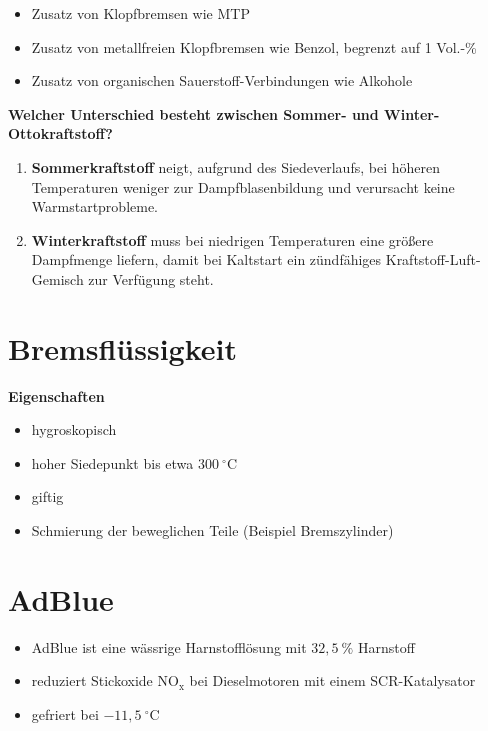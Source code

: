 \begin{enumerate}
  \begin{itemize}
  \item
    Zusatz von Klopfbremsen wie MTP
  \item
    Zusatz von metallfreien Klopfbremsen wie Benzol, begrenzt auf 1
    Vol.-\%
  \item
    Zusatz von organischen Sauerstoff-Verbindungen wie Alkohole
  \end{itemize}
\end{enumerate}

\textbf{Welcher Unterschied besteht zwischen Sommer- und
Winter-Ottokraftstoff?}

\begin{enumerate}
\item
  \textbf{Sommerkraftstoff} neigt, aufgrund des Siedeverlaufs, bei
  höheren Temperaturen weniger zur Dampfblasenbildung und verursacht
  keine Warmstartprobleme.
\item
  \textbf{Winterkraftstoff} muss bei niedrigen Temperaturen eine größere
  Dampfmenge liefern, damit bei Kaltstart ein zündfähiges
  Kraftstoff-Luft-Gemisch zur Verfügung steht.
\end{enumerate}

\section{Bremsflüssigkeit}\label{bremsfluessigkeit}

\textbf{Eigenschaften}

\begin{itemize}
\item
  hygroskopisch
\item
  hoher Siedepunkt bis etwa $300~^\circ\text{C}$
\item
  giftig
\item
  Schmierung der beweglichen Teile (Beispiel Bremszylinder)
\end{itemize}

\section{AdBlue}\label{adblue}

\begin{itemize}
\item
  AdBlue ist eine wässrige Harnstofflösung mit $32,5~\%$ Harnstoff
\item
  reduziert Stickoxide $\text{NO}_\text{x}$ bei Dieselmotoren mit
  einem SCR-Katalysator
\item
  gefriert bei $- 11,5~^\circ\text{C}$
\end{itemize}

